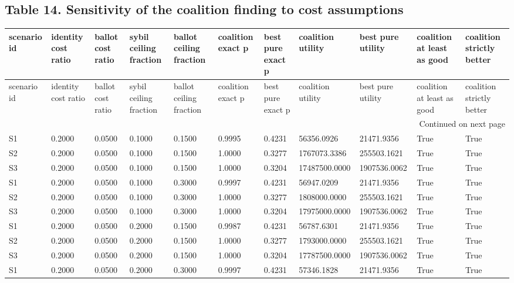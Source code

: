 \documentclass[11pt,a4paper]{article}
\begin{document}
\begin{landscape}
\subsection*{Table 14. Sensitivity of the coalition finding to cost assumptions}
{\tiny
\setlength{\tabcolsep}{3pt}
\begin{longtable}{lllllllllll}
\toprule
scenario id & identity cost ratio & ballot cost ratio & sybil ceiling fraction & ballot ceiling fraction & coalition exact p & best pure exact p & coalition utility & best pure utility & coalition at least as good & coalition strictly better \\
\midrule
\endfirsthead
\toprule
scenario id & identity cost ratio & ballot cost ratio & sybil ceiling fraction & ballot ceiling fraction & coalition exact p & best pure exact p & coalition utility & best pure utility & coalition at least as good & coalition strictly better \\
\midrule
\endhead
\midrule
\multicolumn{11}{r}{Continued on next page} \\
\midrule
\endfoot
\bottomrule
\endlastfoot
S1 & 0.2000 & 0.0500 & 0.1000 & 0.1500 & 0.9995 & 0.4231 & 56356.0926 & 21471.9356 & True & True \\
S2 & 0.2000 & 0.0500 & 0.1000 & 0.1500 & 1.0000 & 0.3277 & 1767073.3386 & 255503.1621 & True & True \\
S3 & 0.2000 & 0.0500 & 0.1000 & 0.1500 & 1.0000 & 0.3204 & 17487500.0000 & 1907536.0062 & True & True \\
S1 & 0.2000 & 0.0500 & 0.1000 & 0.3000 & 0.9997 & 0.4231 & 56947.0209 & 21471.9356 & True & True \\
S2 & 0.2000 & 0.0500 & 0.1000 & 0.3000 & 1.0000 & 0.3277 & 1808000.0000 & 255503.1621 & True & True \\
S3 & 0.2000 & 0.0500 & 0.1000 & 0.3000 & 1.0000 & 0.3204 & 17975000.0000 & 1907536.0062 & True & True \\
S1 & 0.2000 & 0.0500 & 0.2000 & 0.1500 & 0.9987 & 0.4231 & 56787.6301 & 21471.9356 & True & True \\
S2 & 0.2000 & 0.0500 & 0.2000 & 0.1500 & 1.0000 & 0.3277 & 1793000.0000 & 255503.1621 & True & True \\
S3 & 0.2000 & 0.0500 & 0.2000 & 0.1500 & 1.0000 & 0.3204 & 17787500.0000 & 1907536.0062 & True & True \\
S1 & 0.2000 & 0.0500 & 0.2000 & 0.3000 & 0.9997 & 0.4231 & 57346.1828 & 21471.9356 & True & True \\

\end{longtable}}
\end{landscape}
\end{document}
